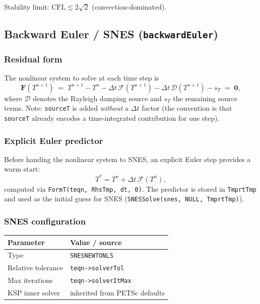 \documentclass[12pt,a4paper]{article}
\begin{document}
Stability limit: $\text{CFL} \lesssim 2\sqrt{2}$ (convection-dominated).

\subsection{Backward Euler / SNES (\texttt{backwardEuler})}
\label{ssec:teqn-be}

\subsubsection*{Residual form}

The nonlinear system to solve at each time step is
\begin{equation}
  \mathbf{F}(T^{n+1}) \;=\;
  T^{n+1} - T^n
  - \Delta t\,\mathcal{F}(T^{n+1})
  - \Delta t\,\mathcal{D}(T^{n+1})
  - s_T
  \;=\; \mathbf{0},
  \label{eq:teqn-snes-residual}
\end{equation}
where $\mathcal{D}$ denotes the Rayleigh damping source and $s_T$ the remaining
source terms.
Note: \texttt{sourceT} is added \emph{without} a $\Delta t$ factor (the
convention is that \texttt{sourceT} already encodes a time-integrated
contribution for one step).

\subsubsection*{Explicit Euler predictor}

Before handing the nonlinear system to SNES, an explicit Euler step provides a
warm start:
\begin{equation}
  T^{*} = T^n + \Delta t\,\mathcal{F}(T^n),
  \label{eq:teqn-predictor}
\end{equation}
computed via \texttt{FormT(teqn, RhsTmp, dt, 0)}.
The predictor is stored in \texttt{TmprtTmp} and used as the initial guess for
SNES (\texttt{SNESSolve(snes, NULL, TmprtTmp)}).

\subsubsection*{SNES configuration}

\begin{center}
\begin{tabular}{ll}
\toprule
Parameter & Value / source \\
\midrule
Type & \texttt{SNESNEWTONLS} \\
Relative tolerance & \texttt{teqn->solverTol} \\
Max iterations & \texttt{teqn->solverItMax} \\
KSP inner solver & inherited from PETSc defaults \\
\bottomrule
\end{tabular}
\end{center}
\end{document}
